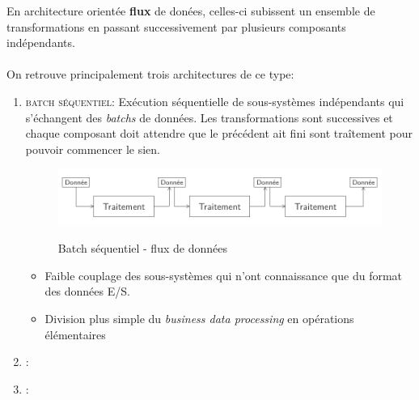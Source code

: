 \item{}
{\vrai}
{En architecture orientée \textbf{flux} de donées, celles-ci subissent un ensemble de transformations en passant successivement par plusieurs composants indépendants. 
\paragraph{}
On retrouve principalement trois architectures de ce type:
\begin{enumerate}
\item\textcolor{ltred}{\textsc{batch séquentiel}}:
	Exécution séquentielle de sous-systèmes indépendants qui s'échangent des \textit{batchs} de données. Les transformations sont successives et chaque composant doit attendre que le précédent ait fini sont traîtement pour pouvoir commencer le sien.
	\begin{figure}[h!]
	\center\includegraphics[scale=.3]{images/flux-donnees-batch}
	\caption{Batch séquentiel - flux de données}\cite{ref1}
	\end{figure}
	\begin{itemize}
	\paragraph{}
	\item[\textcolor{dkgreen}{\ding{52}}] Faible couplage des sous-systèmes qui n'ont connaissance que du format des données E/S. 
	\item[\textcolor{dkgreen}{\ding{52}}] Division plus simple du \textit{business data processing} en opérations élémentaires
	\end{itemize}
\item\textcolor{ltred}{\textsc{}}:
\item\textcolor{ltred}{\textsc{}}:
\end{enumerate}

}

\item{}
{}
{}

\item{}
{}
{}

\item{}
{}
{}